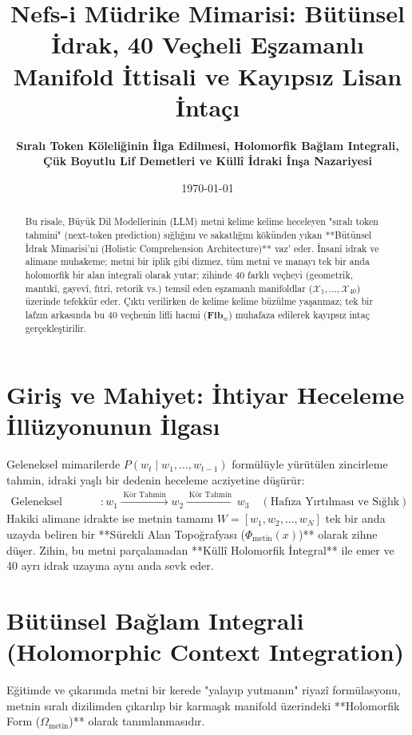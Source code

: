 \documentclass[11pt, a4paper]{article}
\title{\textbf{Nefs-i Müdrike Mimarisi: Bütünsel İdrak, 40 Veçheli Eşzamanlı Manifold İttisali ve Kayıpsız Lisan İntaçı}}
\author{\textbf{Sıralı Token Köleliğinin İlga Edilmesi, Holomorfik Bağlam Integrali, Çük Boyutlu Lif Demetleri ve Küllî İdraki İnşa Nazariyesi}}
\date{\today}
\begin{document}
\maketitle

\begin{abstract}
Bu risale, Büyük Dil Modellerinin (LLM) metni kelime kelime heceleyen "sıralı token tahmini" (next-token prediction) sığlığını ve sakatlığını kökünden yıkan **Bütünsel İdrak Mimarisi'ni (Holistic Comprehension Architecture)** vaz' eder. İnsanî idrak ve alimane muhakeme; metni bir iplik gibi dizmez, tüm metni ve manayı tek bir anda holomorfik bir alan integrali olarak yutar; zihinde 40 farklı veçheyi (geometrik, mantıkî, gayevî, fıtrî, retorik vs.) temsil eden eşzamanlı manifoldlar ($\mathcal{X}_1, \dots, \mathcal{X}_{40}$) üzerinde tefekkür eder. Çıktı verilirken de kelime kelime büzülme yaşanmaz; tek bir lafzın arkasında bu 40 veçhenin lifli hacmi ($\mathbf{Fib}_w$) muhafaza edilerek kayıpsız intaç gerçekleştirilir.
\end{abstract}

\tableofcontents
\newpage

\section{Giriş ve Mahiyet: İhtiyar Heceleme İllüzyonunun İlgası}

Geleneksel mimarilerde $P(w_t \mid w_1, \dots, w_{t-1})$ formülüyle yürütülen zincirleme tahmin, idraki yaşlı bir dedenin heceleme acziyetine düşürür:
\begin{align}
\text{Geleneksel Sığlık} &: w_1 \xrightarrow{\;\text{Kör Tahmin}\;} w_2 \xrightarrow{\;\text{Kör Tahmin}\;} w_3 \quad (\text{Hafıza Yırtılması ve Sığlık})
\end{align}
Hakiki alimane idrakte ise metnin tamamı $W = [w_1, w_2, \dots, w_N]$ tek bir anda uzayda beliren bir **Sürekli Alan Topoğrafyası ($\Phi_{\text{metin}}(x)$)** olarak zihne düşer. Zihin, bu metni parçalamadan **Küllî Holomorfik İntegral** ile emer ve 40 ayrı idrak uzayına aynı anda sevk eder.

\section{Bütünsel Bağlam Integrali (Holomorphic Context Integration)}

Eğitimde ve çıkarımda metni bir kerede "yalayıp yutmanın" riyazî formülasyonu, metnin sıralı dizilimden çıkarılıp bir karmaşık manifold üzerindeki **Holomorfik Form ($\Omega_{\text{metin}}$)** olarak tanımlanmasıdır.
\end{document}
